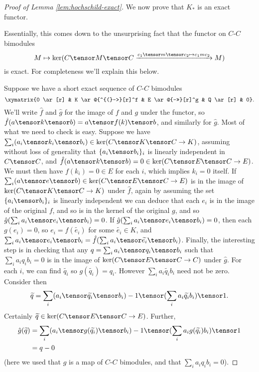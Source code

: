 \begin{proof}[Proof of Lemma \ref{lem:hochschild-exact}]
We now prove that $K_*$ is an exact functor.

Essentially, this comes down to the unsurprising fact that the functor on $C$-$C$ bimodules
\begin{equation*}
M \mapsto \ker(C \tensor M \tensor C \xrightarrow{c_1 \tensor m \tensor c_2 \mapsto c_1 m c_2} M)
\end{equation*}
is exact. For completeness we'll explain this below.

Suppose we have a short exact sequence of $C$-$C$ bimodules $$\xymatrix{0 \ar[r] & K \ar@{^{(}->}[r]^f & E \ar@{->>}[r]^g & Q \ar[r] & 0}.$$
We'll write $\hat{f}$ and $\hat{g}$ for the image of $f$ and $g$ under the functor, so $\hat{f}(a \tensor k \tensor b) = a \tensor f(k) \tensor b$, and similarly for $\hat{g}$.
Most of what we need to check is easy.
Suppose we have $\sum_i (a_i \tensor k_i \tensor b_i) \in \ker(C \tensor K \tensor C \to K)$, assuming without loss of generality that $\{a_i \tensor b_i\}_i$ is linearly independent in $C \tensor C$, and $\hat{f}(a \tensor k \tensor b) = 0 \in \ker(C \tensor E \tensor C \to E)$. We must then have $f(k_i) = 0 \in E$ for each $i$, which implies $k_i=0$ itself. 
If $\sum_i (a \tensor e \tensor b) \in \ker(C \tensor E \tensor C \to E)$ is in the image of $\ker(C \tensor K \tensor C \to K)$ under $\hat{f}$, again by assuming the set  $\{a_i \tensor b_i\}_i$ is linearly independent we can deduce that each
$e_i$ is in the image of the original $f$, and so is in the kernel of the original $g$, and so $\hat{g}(\sum_i a_i \tensor e_i \tensor b_i) = 0$.
If $\hat{g}(\sum_i a_i \tensor e_i \tensor b_i) = 0$, then each $g(e_i) = 0$, so $e_i = f(\widetilde{e_i})$ for some $\widetilde{e_i} \in K$, and $\sum_i a_i \tensor e_i \tensor b_i = \hat{f}(\sum_i a_i \tensor \widetilde{e_i} \tensor b_i)$.
Finally, the interesting step is in checking that any $q = \sum_i a_i \tensor q_i \tensor b_i$ such that $\sum_i a_i q_i b_i = 0$ is in the image of $\ker(C \tensor E \tensor C \to C)$ under $\hat{g}$.
For each $i$, we can find $\widetilde{q_i}$ so $g(\widetilde{q_i}) = q_i$. However $\sum_i a_i \widetilde{q_i} b_i$ need not be zero.
Consider then $$\widetilde{q} = \sum_i (a_i \tensor \widetilde{q_i} \tensor b_i) - 1 \tensor (\sum_i a_i \widetilde{q_i} b_i) \tensor 1.$$ Certainly
$\widetilde{q} \in \ker(C \tensor E \tensor C \to E)$. Further,
\begin{align*}
\hat{g}(\widetilde{q}) & = \sum_i (a_i \tensor g(\widetilde{q_i}) \tensor b_i) - 1 \tensor (\sum_i a_i g(\widetilde{q_i}) b_i) \tensor 1 \\
                       & = q - 0
\end{align*}
(here we used that $g$ is a map of $C$-$C$ bimodules, and that $\sum_i a_i q_i b_i = 0$).


\end{proof}
